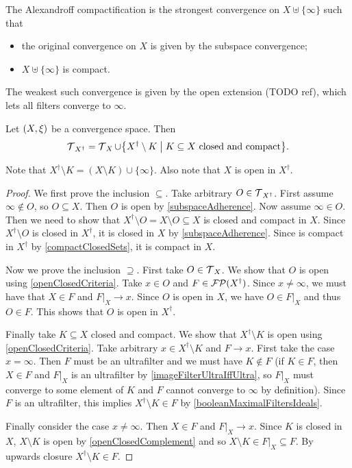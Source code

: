 The Alexandroff compactification is the strongest convergence on $X\uplus \{\infty\}$ such that
\begin{itemize}
\item the original convergence on $X$ is given by the subspace convergence;
\item $X\uplus \{\infty\}$ is compact.
\end{itemize}
The weakest such convergence is given by the open extension (TODO ref), which lets all filters converge to $\infty$.

\begin{proposition} \label{topologyOnePointCompactification}
Let $\sSet{X, \xi}$ be a convergence space. Then
\[ \topology_{X^\dagger} = \topology_X \cup \setbuilder{X^\dagger \setminus K}{\text{$K\subseteq X$ closed and compact}}. \]
\end{proposition}
Note that $X^\dagger \setminus K = (X\setminus K)\cup \{\infty\}$. Also note that $X$ is open in $X^\dagger$.
\begin{proof}
We first prove the inclusion $\boxed{\subseteq}$. Take arbitrary $O\in \operatorname{\mathcal{T}}_{X^\dagger}$. First assume $\infty\notin O$, so $O\subseteq X$. Then $O$ is open by \ref{subspaceAdherence}.
Now assume $\infty\in O$. Then we need to show that $X^\dagger \setminus O = X\setminus O \subseteq X$ is closed and compact in $X$. Since $X^\dagger \setminus O$ is closed in $X^\dagger$, it is closed in $X$ by \ref{subspaceAdherence}. Since is compact in $X^\dagger$ by \ref{compactClosedSets}, it is compact in $X$.

Now we prove the inclusion $\boxed{\supseteq}$. First take $O\in \operatorname{\mathcal{T}}_X$. We show that $O$ is open using \ref{openClosedCriteria}. Take $x\in O$ and $F\in \operatorname{\mathcal{FP}}(X^\dagger)$. Since $x\neq \infty$, we must have that $X\in F$ and $F|_X\to x$. Since $O$ is open in $X$, we have $O\in F|_X$ and thus $O\in F$. This shows that $O$ is open in $X^\dagger$.

Finally take $K\subseteq X$ closed and compact. We show that $X^\dagger \setminus K$ is open using \ref{openClosedCriteria}. Take arbitrary $x\in X^\dagger \setminus K$ and $F\to x$. First take the case $x = \infty$. Then $F$ must be an ultrafilter and we must have $K\notin F$ (if $K\in F$, then $X\in F$ and $F|_X$ is an ultrafilter by \ref{imageFilterUltraIffUltra}, so $F|_X$ must converge to some element of $K$ and $F$ cannot converge to $\infty$ by definition). Since $F$ is an ultrafilter, this implies $X^\dagger \setminus K\in F$ by \ref{booleanMaximalFiltersIdeals}.

Finally consider the case $x\neq \infty$. Then $X\in F$ and $F|_X \to x$. Since $K$ is closed in $X$, $X\setminus K$ is open by \ref{openClosedComplement} and so $X\setminus K \in F|_X \subseteq F$. By upwards closure $X^\dagger \setminus K\in F$.
\end{proof}

